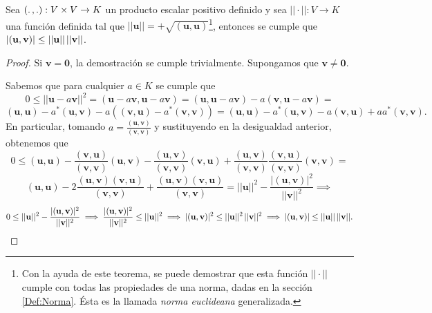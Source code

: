 \documentclass[12pt]{article}
\newenvironment{teorema}[2][Teorema]{\begin{trivlist}
\item[\hskip \labelsep {\bfseries #1}\hskip \labelsep {\bfseries #2.}]}{\end{trivlist}}
\begin{document}
\begin{teorema} {2.2.3.1} 

    Sea $(.\hspace{0.5mm},.):V\times V\rightarrow K$ un producto escalar positivo definido y sea $||\cdot ||:V\rightarrow K$ una función definida tal que $||\mathbf{u}||=+\sqrt{(\mathbf{u},\mathbf{u})}$\footnote{Con la ayuda de este teorema, se puede demostrar que esta función $||\cdot ||$ cumple con todas las propiedades de una norma, dadas en la sección \ref{Def:Norma}. Ésta es la llamada \emph{norma euclideana} generalizada.}, entonces se cumple que $|(\mathbf{u},\mathbf{v})|\leq ||\mathbf{u}||\hspace{0.5mm}||\mathbf{v}||$.

\begin{proof}
    Si $\mathbf{v}=\mathbf{0}$, la demostración se cumple trivialmente. Supongamos que $\mathbf{v}\neq\mathbf{0}$. 

    Sabemos que para cualquier $a\in K$ se cumple que $$0\leq ||\mathbf{u}-a\mathbf{v}||^2 = (\mathbf{u}-a\mathbf{v},\mathbf{u}-a\mathbf{v})= (\mathbf{u},\mathbf{u}-a\mathbf{v})-a(\mathbf{v},\mathbf{u}-a\mathbf{v})=$$ $$(\mathbf{u},\mathbf{u})-a^*(\mathbf{u},\mathbf{v})-a((\mathbf{v},\mathbf{u})-a^*(\mathbf{v},\mathbf{v}))=(\mathbf{u},\mathbf{u})-a^*(\mathbf{u},\mathbf{v})-a(\mathbf{v},\mathbf{u})+aa^*(\mathbf{v},\mathbf{v}).$$ \noindent En particular, tomando $a=\frac{(\mathbf{u},\mathbf{v})}{(\mathbf{v},\mathbf{v})}$ y sustituyendo en la desigualdad anterior, obtenemos que $$0\leq(\mathbf{u},\mathbf{u})-\frac{(\mathbf{v},\mathbf{u})}{(\mathbf{v},\mathbf{v})}(\mathbf{u},\mathbf{v})-\frac{(\mathbf{u},\mathbf{v})}{(\mathbf{v},\mathbf{v})}(\mathbf{v},\mathbf{u})+\frac{(\mathbf{u},\mathbf{v})}{(\mathbf{v},\mathbf{v})}\frac{(\mathbf{v},\mathbf{u})}{(\mathbf{v},\mathbf{v})}(\mathbf{v},\mathbf{v})=$$ $$(\mathbf{u},\mathbf{u})-2\frac{(\mathbf{u},\mathbf{v})(\mathbf{v},\mathbf{u})}{(\mathbf{v},\mathbf{v})}+\frac{(\mathbf{u},\mathbf{v})(\mathbf{v},\mathbf{u})}{(\mathbf{v},\mathbf{v})}=||\mathbf{u}||^2-\frac{|(\mathbf{u},\mathbf{v})|^2}{||\mathbf{v}||^2}\implies$$ $$0\leq ||\mathbf{u}||^2-\frac{|(\mathbf{u},\mathbf{v})|^2}{||\mathbf{v}||^2}\implies \frac{|(\mathbf{u},\mathbf{v})|^2}{||\mathbf{v}||^2}\leq ||\mathbf{u}||^2\implies|(\mathbf{u},\mathbf{v})|^2\leq ||\mathbf{u}||^2\hspace{0.5mm}||\mathbf{v}||^2\implies|(\mathbf{u},\mathbf{v})|\leq ||\mathbf{u}||\hspace{0.5mm}||\mathbf{v}||.$$

\end{proof}

\end{teorema}
\end{document}

